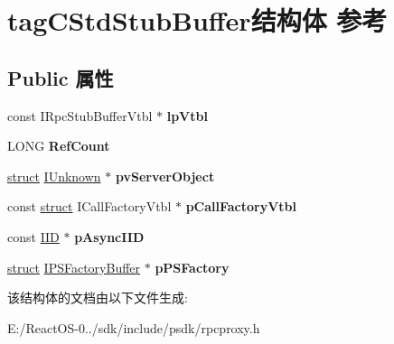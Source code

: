 \hypertarget{structtag_c_std_stub_buffer}{}\section{tag\+C\+Std\+Stub\+Buffer结构体 参考}
\label{structtag_c_std_stub_buffer}
\subsection*{Public 属性}
\begin{DoxyCompactItemize}
\item 
\mbox{\label{structtag_c_std_stub_buffer_aa23633205473151e6bdf3ac99c68e1ef}} 
const I\+Rpc\+Stub\+Buffer\+Vtbl $\ast$ {\bfseries lp\+Vtbl}
\item 
\mbox{\label{structtag_c_std_stub_buffer_a496fe8e9721290dadf7e8e1dc0e0fedf}} 
L\+O\+NG {\bfseries Ref\+Count}
\item 
\mbox{\label{structtag_c_std_stub_buffer_a78a42640b7edd028f033c0d025e538a7}} 
\hyperlink{interfacestruct}{struct} \hyperlink{interface_i_unknown}{I\+Unknown} $\ast$ {\bfseries pv\+Server\+Object}
\item 
\mbox{\label{structtag_c_std_stub_buffer_a2cfe4f08bc40c600601b2e96c67ffc2b}} 
const \hyperlink{interfacestruct}{struct} I\+Call\+Factory\+Vtbl $\ast$ {\bfseries p\+Call\+Factory\+Vtbl}
\item 
\mbox{\label{structtag_c_std_stub_buffer_a3962746d61e1e8a996ea55671c87d470}} 
const \hyperlink{struct___i_i_d}{I\+ID} $\ast$ {\bfseries p\+Async\+I\+ID}
\item 
\mbox{\label{structtag_c_std_stub_buffer_aa9ffb20ca8e41643f09bcfbf3906ea4d}} 
\hyperlink{interfacestruct}{struct} \hyperlink{interface_i_p_s_factory_buffer}{I\+P\+S\+Factory\+Buffer} $\ast$ {\bfseries p\+P\+S\+Factory}
\end{DoxyCompactItemize}


该结构体的文档由以下文件生成\+:\begin{DoxyCompactItemize}
\item 
E\+:/\+React\+O\+S-\/0../sdk/include/psdk/rpcproxy.\+h\end{DoxyCompactItemize}
